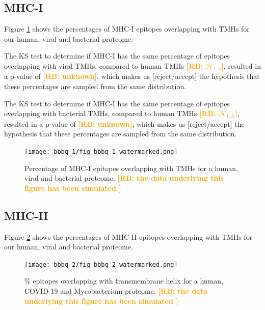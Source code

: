 \documentclass{article}
\newcommand{\richel}[1]{\textcolor{orange}{\textbf{[RB: #1]}}}
\begin{document}
\subsection{MHC-I}

Figure \ref{fig:1} shows the percentages of MHC-I epitopes overlapping 
with TMHs for our human, viral and bacterial proteome.

The KS test to determine if MHC-I has the same percentage 
of epitopes overlapping with viral TMHs, 
compared to human TMHs \richel{$\mathcal{H}_{1,V}$},
resulted in a p-value of \richel{unknown},
which makes us [reject/accept] the hypothesis that these percentages
are sampled from the same distribution. 

The KS test to determine if MHC-I has the same percentage 
of epitopes overlapping with bacterial TMHs, 
compared to human TMHs \richel{$\mathcal{H}_{1,B}$},
resulted in a p-value of \richel{unknown},
which makes us [reject/accept] the hypothesis that these percentages
are sampled from the same distribution. 

\begin{figure}[!htbp]
  \texttt{[image: bbbq\_1/fig\_bbbq\_1\_watermarked.png]}
  \caption{
    Percentage of MHC-I epitopes overlapping with TMHs
    for a human, viral and bacterial proteome.
    \richel{
      the data underlying this figure has been simulated
    }
  }
  \label{fig:1}
\end{figure}

\subsection{MHC-II}

Figure \ref{fig:2} shows the percentages of MHC-II epitopes overlapping 
with TMHs for our human, viral and bacterial proteome.

\begin{figure}[!htbp]
  \texttt{[image: bbbq\_2/fig\_bbbq\_2\_watermarked.png]}
  \caption{
    \% epitopes overlapping with transmembrane helix
    for a human, COVID-19 and Mycobacterium proteome.
    \richel{
      the data underlying this figure has been simulated
    }
  }
  \label{fig:2}
\end{figure}

\end{document}
